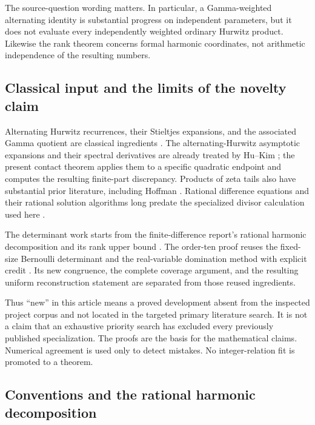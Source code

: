 The source-question wording matters. In particular, a Gamma-weighted
alternating identity is substantial progress on independent parameters,
but it does not evaluate every independently weighted ordinary Hurwitz
product. Likewise the rank theorem concerns formal harmonic coordinates,
not arithmetic independence of the resulting numbers.

\subsection{Classical input and the limits of the novelty claim}

Alternating Hurwitz recurrences, their Stieltjes expansions, and the
associated Gamma quotient are classical ingredients
\cite{bil:HuKim,bil:WangHuKim}. The alternating-Hurwitz asymptotic
expansions and their spectral derivatives are already treated by
Hu--Kim \cite{HuKimAsymptotic}; the present contact theorem applies them
to a specific quadratic endpoint and computes the resulting finite-part
discrepancy. Products of zeta tails also have substantial prior
literature, including Hoffman \cite{bil:Hoffman}. Rational difference
equations and their rational solution algorithms long predate the
specialized divisor calculation used here \cite{rat:Abramov}.

The determinant work starts from the finite-difference report's rational
harmonic decomposition and its rank upper bound \cite{FiniteDifferenceIncoming}.
The order-ten proof reuses the fixed-size Bernoulli determinant and
the real-variable domination method with explicit credit
\cite{GeneralHankel,AlternatingIncoming,QuarticIncoming}. Its new
congruence, the complete coverage argument, and the resulting uniform
reconstruction statement are separated from those reused ingredients.

Thus ``new'' in this article means a proved development absent from
the inspected project corpus and not located in the targeted primary
literature search. It is not a claim that an exhaustive priority search
has excluded every previously published specialization. The proofs are
the basis for the mathematical claims. Numerical agreement is used only
to detect mistakes. No integer-relation fit is promoted to a theorem.

\subsection{Conventions and the rational harmonic decomposition}

